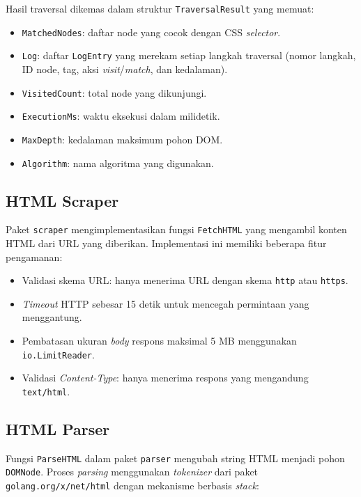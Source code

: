 Hasil traversal dikemas dalam struktur \texttt{TraversalResult} yang memuat:
\begin{itemize}
    \item \texttt{MatchedNodes}: daftar node yang cocok dengan CSS \textit{selector}.
    \item \texttt{Log}: daftar \texttt{LogEntry} yang merekam setiap langkah traversal (nomor langkah, ID node, tag, aksi \textit{visit}/\textit{match}, dan kedalaman).
    \item \texttt{VisitedCount}: total node yang dikunjungi.
    \item \texttt{ExecutionMs}: waktu eksekusi dalam milidetik.
    \item \texttt{MaxDepth}: kedalaman maksimum pohon DOM.
    \item \texttt{Algorithm}: nama algoritma yang digunakan.
\end{itemize}

\subsection{HTML Scraper}

Paket \texttt{scraper} mengimplementasikan fungsi \texttt{FetchHTML} yang mengambil konten HTML dari URL yang diberikan. Implementasi ini memiliki beberapa fitur pengamanan:

\begin{itemize}
    \item Validasi skema URL: hanya menerima URL dengan skema \texttt{http} atau \texttt{https}.
    \item \textit{Timeout} HTTP sebesar 15 detik untuk mencegah permintaan yang menggantung.
    \item Pembatasan ukuran \textit{body} respons maksimal 5 MB menggunakan \texttt{io.LimitReader}.
    \item Validasi \textit{Content-Type}: hanya menerima respons yang mengandung \texttt{text/html}.
\end{itemize}

\subsection{HTML Parser}

Fungsi \texttt{ParseHTML} dalam paket \texttt{parser} mengubah string HTML menjadi pohon \texttt{DOMNode}. Proses \textit{parsing} menggunakan \textit{tokenizer} dari paket \texttt{golang.org/x/net/html} dengan mekanisme berbasis \textit{stack}:


